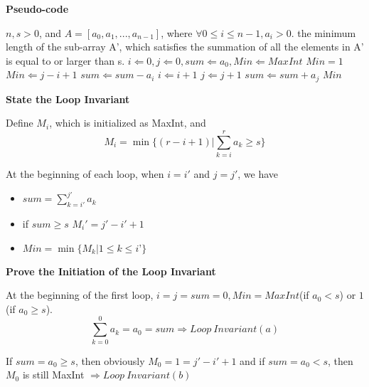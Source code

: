 \documentclass[12pt]{article}
\newenvironment{solution}[2][Solution]{\begin{trivlist}
\item[\hskip \labelsep {\bfseries #1}]}{\end{trivlist}}
\begin{document}
\begin{solution}{}
    \item[(I)] \textbf{Pseudo-code}
    \begin{algorithm}
        \begin{algorithmic}
            \REQUIRE $n,s>0$, and $A=[a_0,a_1,...,a_{n-1}]$, where $\forall 0\leq i\leq n-1, a_i>0$.
            \ENSURE the minimum length of the sub-array A', which satisfies the summation of all the elements in A' is equal to or larger than s.
            \STATE
            \STATE $i\Leftarrow 0, j\Leftarrow 0, sum\Leftarrow a_0, Min\Leftarrow MaxInt$
                \STATE $Min=1$
            \ENDIF
                        \STATE $Min\Leftarrow j-i+1$
                    \ENDIF
                    \STATE $sum\Leftarrow sum-a_i$
                    \STATE $i\Leftarrow i+1$
                \ELSE
                    \STATE $j\Leftarrow j+1$
                    \STATE $sum\Leftarrow sum+a_j$
                \ENDIF
            \ENDWHILE
            \RETURN $Min$
        \end{algorithmic}
    \end{algorithm}
    \item[(II)] \textbf{State the Loop Invariant}
    \item[] Define $M_i$, which is initialized as MaxInt, and
    \[M_i=\min\{(r-i+1)|\sum_{k=i}^{r}{a_k}\geq s\}\]
    \item[] At the beginning of each loop, when $i=i'$ and $j=j'$, we have
    \begin{itemize}
        \item[(a)] $sum=\sum_{k=i'}^{j'}{a_k}$
        \item[(b)] if $sum\geq s$ \Rightarrow $M_i'=j'-i'+1$
        \item[(c)] $Min=\min\{M_k|1\leq k\leq i’\}$
    \end{itemize}
    \item[(III)] \textbf{Prove the Initiation of the Loop Invariant}
    \item[] At the beginning of the first loop, $i=j=sum=0, Min=MaxInt$(if $a_0<s$) or $1$ (if $a_0\geq s$).
    \[\sum_{k=0}^{0}{a_k}=a_0=sum\Rightarrow Loop\ Invariant(a)\]
    \item[] If $sum=a_0\geq s$, then obviously $M_0=1=j'-i'+1$ and if $sum=a_0<s$, then $M_0$ is still MaxInt $\Rightarrow Loop\ Invariant(b)$

\end{solution}
\end{document}
